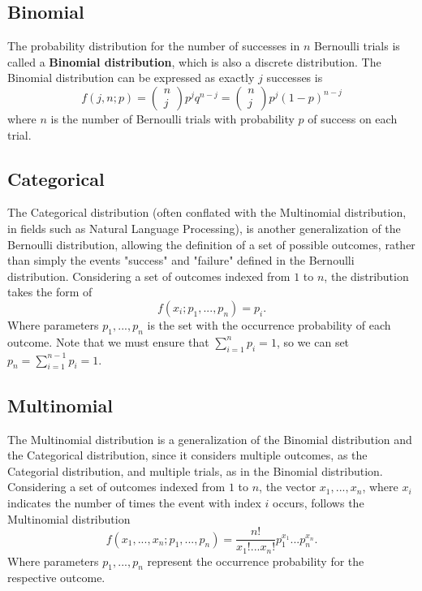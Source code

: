 \subsection{\label{binomial} Binomial}
The probability distribution for the number of successes in $n$ Bernoulli trials is called a {\bf Binomial distribution}, which is also a discrete distribution.
The Binomial distribution can be expressed as 
exactly $j$ successes is 
\begin{equation*}
f(j,n;p)= \left(\begin{array}{c}
n \\
j \end{array}\right) p^{j}q^{n-j} = \left(\begin{array}{c}
n \\
j \end{array}\right) p^{j}(1-p)^{n-j}
\end{equation*}
where $n$ is the number of Bernoulli trials with probability $p$ of success on each trial.

\subsection{\label{categorical} Categorical}
The Categorical distribution (often conflated with the Multinomial distribution, in fields such as Natural Language Processing), is another generalization of the Bernoulli distribution, allowing the definition of a set of possible outcomes, rather than simply the events "success" and "failure" defined in the Bernoulli distribution.
Considering a set of outcomes indexed from $1$ to $n$, the distribution takes the form of
\begin{equation*}
f(x_i;p_1,...,p_n) = p_i.
\end{equation*}
Where parameters $p_1,...,p_n$ is the set with the occurrence probability of each outcome. Note that we must ensure that $\sum_{i=1}^np_i=1$, so we can set $p_n = \sum_{i=1}^{n-1}p_i=1$.

\subsection{\label{multinomial} Multinomial}

The Multinomial distribution is a generalization of the Binomial distribution and the Categorical distribution, since it considers multiple outcomes, as the Categorial distribution, and multiple trials, as in the Binomial distribution.
Considering a set of outcomes indexed from $1$ to $n$, the vector $x_1,...,x_n$, where $x_i$ indicates the number of times the event with index $i$ occurs, follows the Multinomial distribution
\begin{equation*}
f(x_1,...,x_n;p_1,...,p_n) = \frac{n!}{x_{1}!...x_{n}!} p_{1}^{x_{1}}...p_{n}^{x_{n}}.
\end{equation*}
Where parameters $p_1,...,p_n$ represent the occurrence probability for the respective outcome. 


